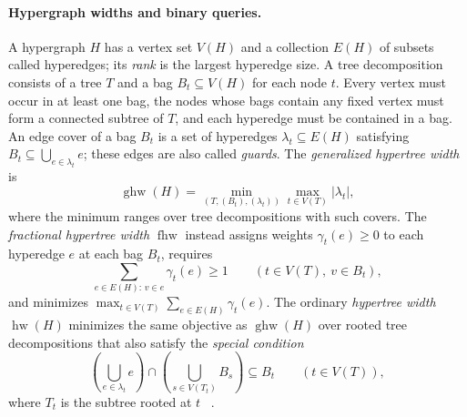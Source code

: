 \paragraph{Hypergraph widths and binary queries.}
A hypergraph $H$ has a vertex set $V(H)$ and a collection $E(H)$ of
subsets called hyperedges; its \emph{rank} is the largest hyperedge size.
A tree decomposition consists of a tree $T$ and a bag $B_t\subseteq V(H)$
for each node $t$. Every vertex must occur in at least one bag, the nodes
whose bags contain any fixed vertex must form a connected subtree of $T$,
and each hyperedge must be contained in a bag. An edge cover of a
bag $B_t$ is a set of hyperedges $\lambda_t\subseteq E(H)$ satisfying
$B_t\subseteq\bigcup_{e\in\lambda_t}e$; these edges are also called
\emph{guards}. The \emph{generalized hypertree width} is
\[
 \operatorname{ghw}(H)
 =\min_{(T,(B_t),(\lambda_t))}\max_{t\in V(T)}|\lambda_t|,
\]
where the minimum ranges over tree decompositions with such covers.
The \emph{fractional hypertree width} $\operatorname{fhw}$
instead assigns weights $\gamma_t(e)\ge0$ to each hyperedge $e$
at each bag $B_t$, requires
\begin{equation}\label{eq:fractional-cover-condition}
 \sum_{e\in E(H):\,v\in e}\gamma_t(e)\ge1
 \qquad(t\in V(T),\ v\in B_t),
\end{equation}
and minimizes $\max_{t\in V(T)}\sum_{e\in E(H)}\gamma_t(e)$.
The ordinary \emph{hypertree width} $\operatorname{hw}(H)$ minimizes
the same objective as $\operatorname{ghw}(H)$ over rooted tree
decompositions that also satisfy the \emph{special condition}
\[
 \left(\bigcup_{e\in\lambda_t}e\right)
 \cap\left(\bigcup_{s\in V(T_t)}B_s\right)\subseteq B_t
 \qquad(t\in V(T)),
\]
where $T_t$ is the subtree rooted at $t$
~\cite[Definitions~2.4--2.7 in the full version]{GottlobEtAlHypertree}.

